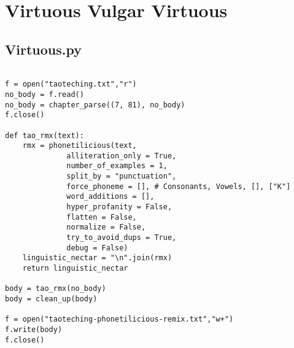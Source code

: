 \documentclass[12pt,a4paper,oneside]{book}
\begin{document}
\part{Virtuous Vulgar Virtuous}

\chapter*{Virtuous.py}

\begin{verbatim}

f = open("taoteching.txt","r")
no_body = f.read()
no_body = chapter_parse((7, 81), no_body)
f.close()

def tao_rmx(text):
    rmx = phonetilicious(text,
              alliteration_only = True, 
              number_of_examples = 1, 
              split_by = "punctuation",
              force_phoneme = [], # Consonants, Vowels, [], ["K"]
              word_additions = [],
              hyper_profanity = False,
              flatten = False, 
              normalize = False, 
              try_to_avoid_dups = True,
              debug = False)
    linguistic_nectar = "\n".join(rmx)
    return linguistic_nectar

body = tao_rmx(no_body)
body = clean_up(body)

f = open("taoteching-phonetilicious-remix.txt","w+")
f.write(body)
f.close()

\end{verbatim}

\newpage
\end{document}
